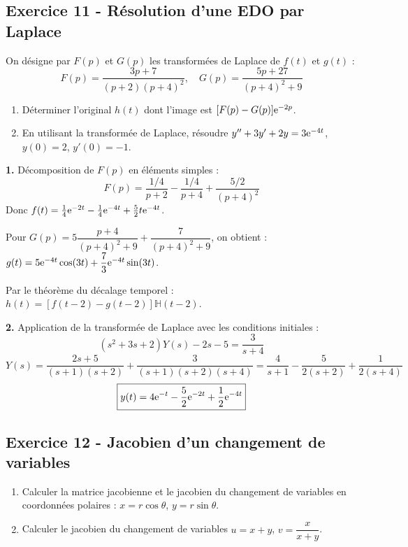\documentclass[12pt,a4paper]{article}
\begin{document}
\subsection*{Exercice 11 - Résolution d'une EDO par Laplace \niveau{\difficile}}

\begin{boiteexercice}
On désigne par $F(p)$ et $G(p)$ les transformées de Laplace de $f(t)$ et $g(t)$ :
\[
F(p) = \frac{3p+7}{(p+2)(p+4)^2}, \quad G(p) = \frac{5p+27}{(p+4)^2+9}
\]
\begin{enumerate}
  \item Déterminer l'original $h(t)$ dont l'image est $[F(p)-G(p)]\mathrm{e}^{-2p}$.
  \item En utilisant la transformée de Laplace, résoudre $y'' + 3y' + 2y = 3\mathrm{e}^{-4t}$, $y(0)=2$, $y'(0)=-1$.
\end{enumerate}
\end{boiteexercice}

\begin{boitecorrige}
\textbf{1.} Décomposition de $F(p)$ en éléments simples :
\[
F(p) = \frac{1/4}{p+2} - \frac{1/4}{p+4} + \frac{5/2}{(p+4)^2}
\]
Donc $f(t) = \frac{1}{4}\mathrm{e}^{-2t} - \frac{1}{4}\mathrm{e}^{-4t} + \frac{5}{2}t\mathrm{e}^{-4t}$.

Pour $G(p) = 5\dfrac{p+4}{(p+4)^2+9} + \dfrac{7}{(p+4)^2+9}$, on obtient :
$g(t) = 5\mathrm{e}^{-4t}\cos(3t) + \dfrac{7}{3}\mathrm{e}^{-4t}\sin(3t)$.

Par le théorème du décalage temporel : $h(t) = [f(t-2)-g(t-2)]\mathbb{H}(t-2)$.

\textbf{2.} Application de la transformée de Laplace avec les conditions initiales :
\[
(s^2+3s+2)Y(s) - 2s - 5 = \frac{3}{s+4}
\]
\[
Y(s) = \frac{2s+5}{(s+1)(s+2)} + \frac{3}{(s+1)(s+2)(s+4)} = \frac{4}{s+1} - \frac{5}{2(s+2)} + \frac{1}{2(s+4)}
\]
\[
\boxed{y(t) = 4\mathrm{e}^{-t} - \frac{5}{2}\mathrm{e}^{-2t} + \frac{1}{2}\mathrm{e}^{-4t}}
\]
\end{boitecorrige}

\subsection*{Exercice 12 - Jacobien d'un changement de variables \niveau{\facile}}

\begin{boiteexercice}
\begin{enumerate}
  \item Calculer la matrice jacobienne et le jacobien du changement de variables en coordonnées polaires :
  $x = r\cos\theta$, $y = r\sin\theta$.
  \item Calculer le jacobien du changement de variables $u = x+y$, $v = \dfrac{x}{x+y}$.
\end{enumerate}
\end{boiteexercice}
\end{document}
